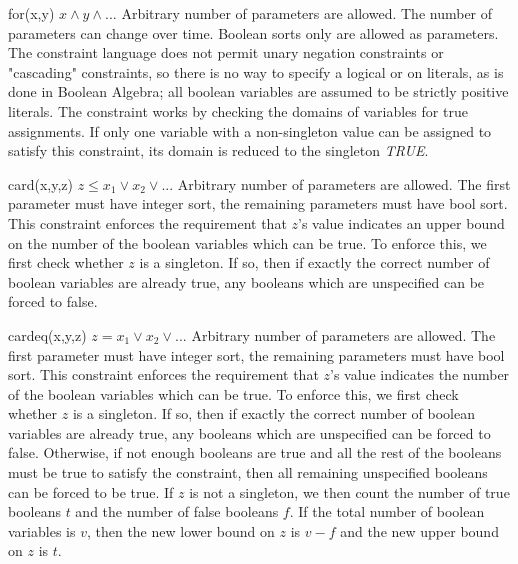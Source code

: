 	{for(x,y)}
	{$x \wedge y \wedge ...$}
	{Arbitrary number of parameters are allowed.  The number of parameters
	can change over time.}
	{Boolean sorts only are allowed as parameters.}
	{The constraint language does not permit
	unary negation constraints or "cascading" constraints, so there is
	no way to specify a logical or on literals, as is done in Boolean Algebra;
	all boolean variables are assumed to be strictly positive literals.
	The constraint works by checking the domains of variables for
	true assignments.  If only one variable with a non-singleton value can
	be assigned to satisfy this constraint, its domain is reduced to the 
	singleton {\em TRUE}.}


	{card(x,y,z)}
	{$z \leq x_1 \vee x_2 \vee...$}
	{Arbitrary number of parameters are allowed.}
	{The first parameter must have integer sort, the remaining parameters must have bool sort.}
	{This constraint enforces the requirement that $z$'s value indicates an upper bound on the
	number of the boolean variables which can be true.  To enforce this, we first check whether
	$z$ is a singleton.  If so, then if exactly the correct number of boolean variables are
	already true, any booleans which are unspecified can be forced to false.}

	{cardeq(x,y,z)}
	{$z = x_1 \vee x_2 \vee...$}
	{Arbitrary number of parameters are allowed.}
	{The first parameter must have integer sort, the remaining parameters must have bool sort.}
	{This constraint enforces the requirement that $z$'s value indicates the
	number of the boolean variables which can be true.  To enforce this, we first check whether
	$z$ is a singleton.  If so, then if exactly the correct number of boolean variables are
	already true, any booleans which are unspecified can be forced to false.  Otherwise, if not enough
	booleans are true and all the rest of the booleans must be true to satisfy the constraint, then
	all remaining unspecified booleans can be forced to be true.  If $z$ is not a singleton, we then
	count the number of true booleans $t$ and the number of false booleans $f$.  If the total number
	of boolean variables is $v$, then the new lower bound on $z$ is $v-f$ and the new upper bound on $z$ is $t$.}

